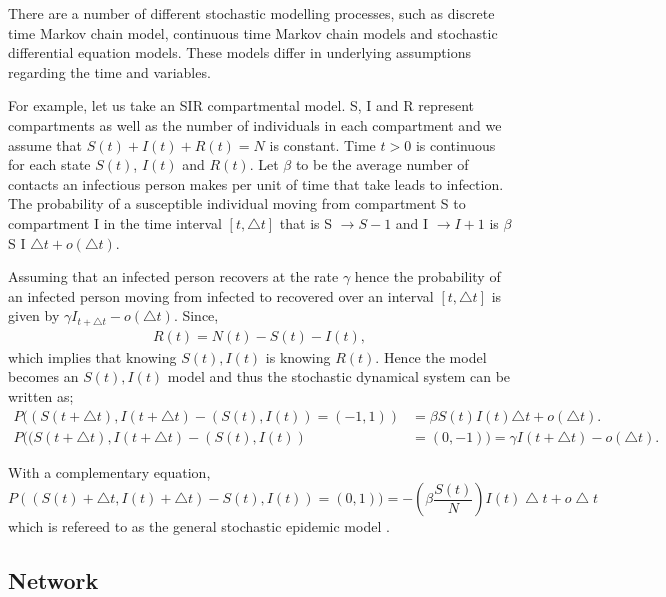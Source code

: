   There are a number of different stochastic modelling processes, such as discrete time Markov chain model, continuous time Markov chain models and stochastic differential equation models. These models differ in underlying assumptions regarding the time and variables.
 
  For example, let us take an SIR compartmental model. S, I and R represent compartments as well as the number of individuals in each compartment and we assume that $S (t) + I (t) + R (t) = N $ is constant. Time $t>0$ is continuous for each state $S (t) $, $I (t) $ and $R (t) $.
  Let $\beta$ to be the average number of contacts an infectious person makes per unit of time that take leads to infection. The probability of a susceptible individual moving from compartment S to compartment I in the time interval $\left[ t,\triangle t \right]$ that is S $\rightarrow S-1$ and I $\rightarrow I + 1 $ is $ \beta$ S I $ \triangle t + o (\triangle t) $.
  
  Assuming that an infected person recovers at the rate $\gamma$ hence the probability of an infected person moving from infected to recovered over an interval $\left[ t,\triangle t \right]$  is given by $\gamma I_ {t + \triangle t} -o (\triangle t) $. Since,
 \begin{align*}
  R(t) = N(t) - S(t) - I(t),
\end{align*}  
which implies that knowing $S(t),I(t)$ is knowing $R(t)$. Hence the model becomes an $S(t),I(t)$ model and thus the stochastic dynamical system can be written as;
 \begin{align}
 P((S(t + \triangle t), I(t + \triangle t) - (S(t) ,I(t)) = (-1,1)) &=  \beta S(t) I(t)  \triangle t + o (\triangle t).
 \\ P ((S(t + \triangle t), I(t + \triangle t) - (S(t) ,I(t)) &= ( 0,-1)) = \gamma I(t + \triangle t) -o (\triangle t).
 \end{align} 
 
With a complementary equation,
\begin{equation}
P((S(t) + \bigtriangleup t, I(t)+ \bigtriangleup t) - S(t), I(t)) =(0,1)) =  -\left( \beta \dfrac{ S(t)}{N}\right) I(t) \bigtriangleup t + o\bigtriangleup t
\end{equation}
which is refereed to as the general stochastic  epidemic model \citep{greenwood2009stochastic}.


\subsection{Network}


